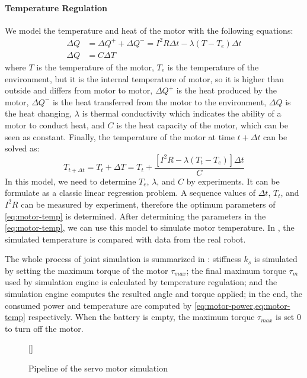 \documentclass{llncs}
\newcommand{\inputtikz}[1]
{
  \StrSubstitute{#1}{/}{.}[\fn]
  \scancs{\filename}{\fn}
  \tikzsetfigurename{\filename}
  
}
\begin{document}
\paragraph{Temperature Regulation}
We model the temperature and heat of the motor with the following equations:
\begin{align}
  \Delta{}Q &= \Delta{}Q^+ + \Delta{}Q^- = I^2R\Delta{}t -\lambda(T-T_e)\Delta{}t \\
  \Delta{}Q &= C\Delta{}T
\end{align}
where $T$ is the temperature of the motor, $T_e$
is the temperature of the environment, but it is the internal temperature
of motor, so it is higher than outside and differs from motor to
motor, $\Delta{}Q^+$ is the heat produced by the motor, $\Delta{}Q^-$ is
the heat transferred from the motor to the environment, $\Delta{}Q$ is the
heat changing, $\lambda$ is thermal conductivity which indicates the
ability of a motor to conduct heat, and $C$ is the heat capacity of
the motor, which can be seen as constant. Finally, the temperature of
the motor at time $t+\Delta{}t$ can be solved as:
\begin{equation}
  \label{eq:motor-temp}
  T_{t+\Delta{}t} = T_t + \Delta{}T = T_t + \frac{[I^2R-\lambda(T_t-T_e)]\Delta{}t}{C}
\end{equation}
In this model, we need to determine $T_e$, $\lambda$, and $C$ by experiments. It can be formulate as a classic linear regression problem.
A sequence values of $\Delta{}t$, $T_t$, and $I^2R$ can be measured by experiment, therefore the optimum parameters of \cref{eq:motor-temp} is determined.
After determining the parameters in the \cref{eq:motor-temp}, we can use this model to simulate motor temperature. In , the simulated temperature is compared with data from the real robot.

The whole process of joint simulation is summarized in
: stiffness $k_s$ is simulated by setting the maximum torque
of the motor $\tau_{max}$; the final maximum torque $\tau_m$ used by simulation engine is calculated by temperature regulation; and the simulation engine computes the resulted angle
and torque applied; in the end, the consumed power and temperature are
computed by \cref{eq:motor-power,eq:motor-temp} respectively. When the battery is empty, the maximum torque $\tau_{max}$ is set 0 to turn off the motor.
\begin{figure}
  \centering
  \inputtikz{joint}
  \caption{Pipeline of the servo motor simulation}
  \label{fig:joint}
\end{figure}
\end{document}

